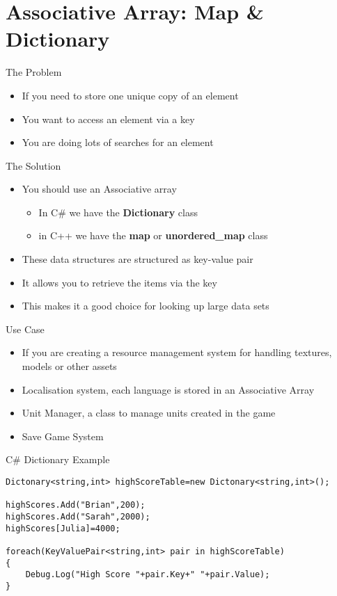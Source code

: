 \part{Associative Array: Map \& Dictionary}
\frame{\partpage}

\begin{frame}{The Problem}
	\begin{itemize}
		\pause \item If you need to store one unique copy of an element
		\pause \item You want to access an element via a key
		\pause \item You are doing lots of searches for an element
	\end{itemize}
\end{frame}

\begin{frame}{The Solution}
	\begin{itemize}
		\pause \item You should use an Associative array
		\begin{itemize}
			\pause \item In C\# we have the \textbf{Dictionary} class
			\pause \item in C++ we have the \textbf{map} or \textbf{unordered\_map}  class
		\end{itemize} 
		\pause \item These data structures are structured as key-value pair
		\pause \item It allows you to retrieve the items via the key
		\pause \item This makes it a good choice for looking up large data sets
	\end{itemize}
\end{frame}

\begin{frame}{Use Case}
	\begin{itemize}
		\pause \item If you are creating a resource management system for handling textures, models or other assets
		\pause \item Localisation system, each language is stored in an Associative Array
		\pause \item Unit Manager, a class to manage units created in the game
		\pause \item Save Game System
	\end{itemize}
\end{frame}

\begin{frame}[fragile]{C\# Dictionary
Example}
\begin{lstlisting}
Dictonary<string,int> highScoreTable=new Dictonary<string,int>();

highScores.Add("Brian",200);
highScores.Add("Sarah",2000);
highScores[Julia]=4000;

foreach(KeyValuePair<string,int> pair in highScoreTable)
{
	Debug.Log("High Score "+pair.Key+" "+pair.Value);
}
\end{lstlisting}
\end{frame}

